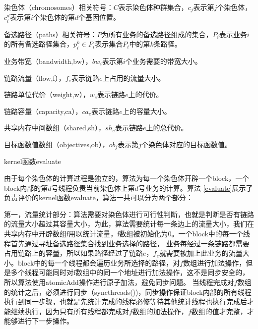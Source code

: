 染色体（chromosomes）相关符号：$C$表示染色体种群集合，$c_j$表示第$j$个染色体，$c^d_i$表示第$i$个染色体的第$d$个基因位置。

备选路径（paths）相关符号：$P$为所有业务的备选路径组成的集合，$P_i$表示业务$i$的所有备选路径集合，$p_i^k \in P_i$表示集合$P_i$中的第$k$条路径。

业务带宽（bandwidth,bw），$bw_i$表示第$i$个业务需要的带宽大小。

链路流量（flow,f），$f_e$表示链路$e$上占用的流量大小。

链路单位代价（weight,w），$w_e$表示链路$e$上的代价。

链路容量（capacity,ca），$ca_e$表示链路$e$上的容量大小。

共享内存中间数组（shared,sh），$sh_e$表示链路$e$上的总代价。

目标函数值数组（objectives,ob），$ob_j$表示第$j$个染色体对应的目标函数值。

\begin{algorithm}[t]
\begin{algorithmic}[1]
\EndFor
{}
\Else
{}
\EndIf
{}
\EndIf
{}
\EndWhile
{}
\EndFunction
\end{algorithmic}
\caption{kernel函数evaluate}
\label{evaluate}
\end{algorithm}

由于每个染色体的计算过程是独立的，算法为每一个染色体开辟一个block，一个block内部的第$d$号线程负责当前染色体上第$d$号业务的计算。算法 \ref{evaluate}展示了负责评价的kernel函数evaluate，算法一共可以分为两个部分：

第一，流量统计部分：算法需要对染色体进行可行性判断，也就是判断是否有链路的流量大小超过其容量大小，为此，算法需要统计每一条边上的流量大小，我们在共享内存中开辟数组f用以统计流量，f数组被初始化为0。一个block中的每一个线程首先通过寻址备选路径集合找到业务选择的路径，
业务每经过一条链路都需要占用链路上的容量，所以如果路径经过了链路$e$，$f_e$就需要被加上此业务的流量大小。block中的每一个线程都会遍历业务所选择的路径，对$f$数组进行加法操作，但是多个线程可能同时对f数组中的同一个地址进行加法操作，这不是同步安全的，所以算法使用atomicAdd操作进行原子加法，避免同步问题。
当线程完成对$f$数组的统计之后，必须进行同步（syncthreads())，同步操作保证block内部的所有线程执行到同一步骤，也就是先统计完成的线程必修等待其他统计线程也执行完成后才能继续执行，因为只有所有线程都完成对$f$数组的加法操作，$f$数组的值才完整，才能够进行下一步操作。

